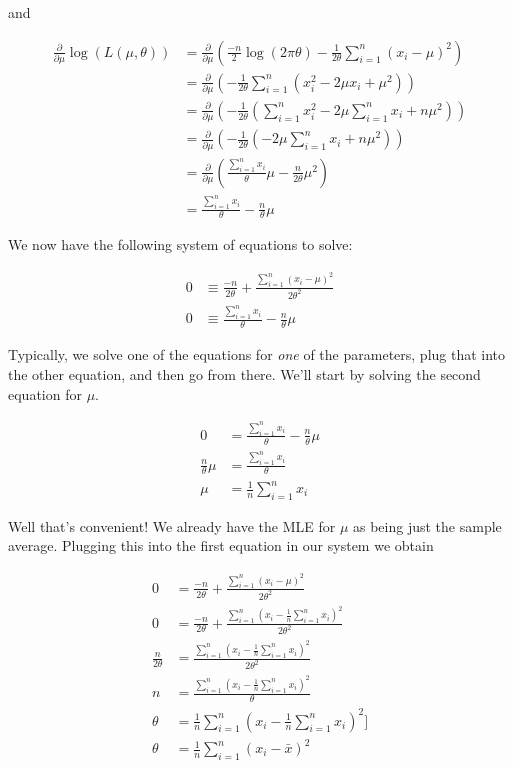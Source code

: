 \documentclass[
  letterpaper,
  DIV=11,
  numbers=noendperiod]{scrreprt}
\begin{document}
and

\begin{align*}
    \frac{\partial}{\partial \mu}\log(L(\mu, \theta)) & = \frac{\partial}{\partial \mu} \left(\frac{-n}{2} \log(2\pi \theta) - \frac{1}{2\theta} \sum_{i = 1}^n (x_i - \mu)^2 \right)\\
    & = \frac{\partial}{\partial \mu} \left( -\frac{1}{2\theta} \sum_{i = 1}^n (x_i^2 - 2 \mu x_i + \mu^2)\right) \\
    & = \frac{\partial}{\partial \mu} \left( -\frac{1}{2\theta} ( \sum_{i = 1}^n x_i^2 - 2 \mu \sum_{i = 1}^n x_i + n\mu^2 )\right) \\
    & = \frac{\partial}{\partial \mu} \left( -\frac{1}{2\theta} (- 2 \mu \sum_{i = 1}^n x_i + n\mu^2 ) \right) \\
    & = \frac{\partial}{\partial \mu} \left(   \frac{\sum_{i = 1}^n x_i}{\theta} \mu - \frac{n}{2\theta}\mu^2  \right) \\
    & = \frac{\sum_{i = 1}^n x_i}{\theta} - \frac{n}{\theta} \mu
\end{align*}

We now have the following system of equations to solve:

\begin{align*}
    0 & \equiv \frac{-n}{2 \theta} + \frac{\sum_{i = 1}^n (x_i - \mu)^2 }{2 \theta^2} \\
    0 & \equiv \frac{\sum_{i = 1}^n x_i}{\theta} - \frac{n}{\theta} \mu
\end{align*}

Typically, we solve one of the equations for \emph{one} of the
parameters, plug that into the other equation, and then go from there.
We'll start by solving the second equation for \(\mu\).

\begin{align*}
    0 & = \frac{\sum_{i = 1}^n x_i}{\theta} - \frac{n}{\theta} \mu \\
    \frac{n}{\theta} \mu & = \frac{\sum_{i = 1}^n x_i}{\theta} \\
    \mu & = \frac{1}{n} \sum_{i = 1}^n x_i
\end{align*}

Well that's convenient! We already have the MLE for \(\mu\) as being
just the sample average. Plugging this into the first equation in our
system we obtain

\begin{align*}
    0 & = \frac{-n}{2 \theta} + \frac{\sum_{i = 1}^n (x_i - \mu)^2 }{2 \theta^2} \\
    0 & = \frac{-n}{2 \theta} + \frac{\sum_{i = 1}^n (x_i - \frac{1}{n} \sum_{i = 1}^n x_i )^2 }{2 \theta^2} \\
    \frac{n}{2 \theta} & = \frac{\sum_{i = 1}^n (x_i - \frac{1}{n} \sum_{i = 1}^n x_i )^2 }{2 \theta^2} \\
    n & = \frac{\sum_{i = 1}^n (x_i - \frac{1}{n} \sum_{i = 1}^n x_i )^2 }{\theta} \\
    \theta & = \frac{1}{n} \sum_{i = 1}^n (x_i - \frac{1}{n} \sum_{i = 1}^n x_i )^2] \\
    \theta & = \frac{1}{n} \sum_{i = 1}^n (x_i - \bar{x} )^2
\end{align*}
\end{document}
